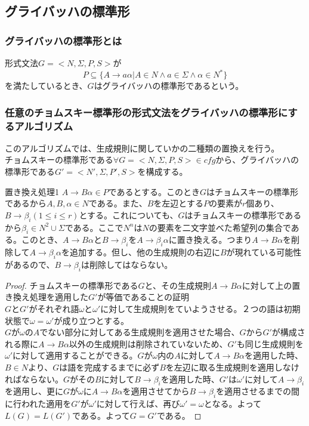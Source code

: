 \documentclass[a4paper]{jarticle}
\begin{document}
\subsection{グライバッハの標準形}
\subsubsection{グライバッハの標準形とは}
形式文法$ G = < N , \Sigma , P , S > $が
\begin{equation}
P \subseteq \bigl\{ A \to a \alpha | A \in N \land a \in \Sigma \land \alpha \in N ^* \bigr\}
\end{equation}
を満たしているとき、$ G $はグライバッハの標準形であるという。\\
\subsubsection{任意のチョムスキー標準形の形式文法をグライバッハの標準形にするアルゴリズム}
このアルゴリズムでは、生成規則に関していかの二種類の置換えを行う。\\
チョムスキーの標準形である$ \forall G = < N , \Sigma , P , S > \in cfg $から、グライバッハの標準形である$ G' = < N' , \Sigma , P' , S > $を構成する。
\begin{itembox}[l]{置き換え処理1}
$ A \to B \alpha \in P $であるとする。このとき$ G $はチョムスキーの標準形であるから$ A , B , \alpha \in N $である。また、$ B $を左辺とする$ P $の要素が$ r $個あり、$ B \to \beta _i \left( 1 \leq i \leq r \right) $とする。これについても、$ G $はチョムスキーの標準形であるから$ \beta _i \in N ^2 \cup \Sigma $である。ここで$ N^n $は$ N $の要素を二文字並べた希望列の集合である。このとき、$ A \to B \alpha $と$ B \to \beta _i $を$ A \to \beta _i \alpha $に置き換える。つまり$ A \to B \alpha $を削除して$ A \to \beta _i \alpha $を追加する。但し、他の生成規則の右辺に$ B $が現れている可能性があるので、$ B \to \beta _i $は削除してはならない。
\end{itembox}
\begin{proof}
チョムスキーの標準形である$G$と、その生成規則$ A \to B \alpha $に対して上の置き換え処理を適用した$G'$が等価であることの証明\\
$ G $と$ G' $がそれぞれ語$ \omega $と$ \omega ' $に対して生成規則をていようさせる。２つの語は初期状態で$ \omega = \omega ' $が成り立つとする。\\
$ G $が$ \omega $の$ A $でない部分に対してある生成規則を適用させた場合、$ G $から$ G' $が構成される際に$ A \to B \alpha $以外の生成規則は削除されていないため、$ G' $も同じ生成規則を$ \omega ' $に対して適用することができる。$ G $が$ \omega $内の$ A $に対して$ A \to B \alpha $を適用した時、$ B \in N $より、$ G $は語を完成するまでに必ず$ B $を左辺に取る生成規則を適用しなければならない。$ G $がその$ B $に対して$ B \to \beta _i $を適用した時、$ G' $は$ \omega ' $に対して$ A \to \beta _i $を適用し、更に$ G $が$ \omega $に$ A \to B \alpha $を適用させてから$ B \to \beta _i $を適用させるまでの間に行われた適用を$ G' $が$ \omega ' $に対して行えば、再び$ \omega ' = \omega $となる。よって$ L \left( G \right) = L \left( G ' \right) $である。よって$ G = G ' $である。
\end{proof}
\end{document}
